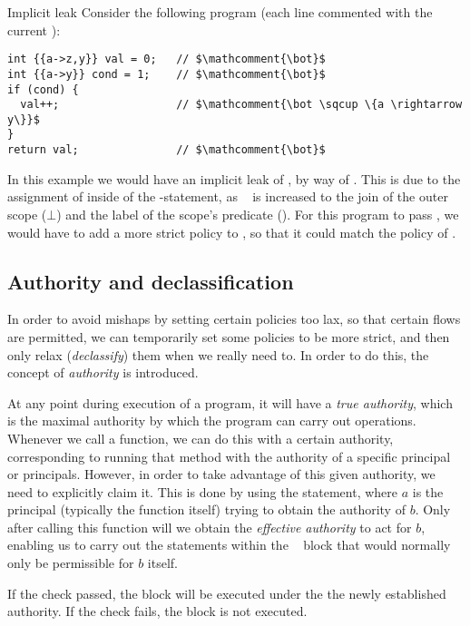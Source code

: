 \begin{example}{Implicit leak}\label{dlm:ex:implicit_leak}
  Consider the following program (each line commented with the current \dlmpc):
  \begin{lstlisting}[style=dlmc]
int {{a->z,y}} val = 0;   // $\mathcomment{\bot}$
int {{a->y}} cond = 1;    // $\mathcomment{\bot}$
if (cond) {
  val++;                  // $\mathcomment{\bot \sqcup \{a \rightarrow y\}}$
}
return val;               // $\mathcomment{\bot}$
  \end{lstlisting}
  In this example we would have an implicit leak of , by way of .
  This is due to the assignment of  inside of the -statement, as \dlmpc~ is increased to the join of the outer scope ($\bot$) and the label of the scope's predicate ().
  For this program to pass \thetool, we would have to add a more strict policy to , so that it could match the policy of .
\end{example}

\subsection{Authority and declassification}\label{dlm:auth_and_declass}
In order to avoid mishaps by setting certain policies too lax, so that certain flows are permitted, we can temporarily set some policies to be more strict, and then only relax (\emph{declassify}) them when we really need to.
In order to do this, the concept of \emph{authority} is introduced.

At any point during execution of a program, it will have a \emph{true authority}, which is the maximal authority by which the program can carry out operations.
Whenever we call a function, we can do this with a certain authority, corresponding to running that method with the authority of a specific principal or principals.
However, in order to take advantage of this given authority, we need to explicitly claim it.
This is done by using the \dlmactsfor{} statement, where $a$ is the principal (typically the function itself) trying to obtain the authority of $b$.
Only after calling this function will we obtain the \emph{effective authority} to act for $b$, enabling us to carry out the statements within the \dlmactsfor~ block that would normally only be permissible for $b$ itself.

If the check passed, the  block will be executed under the the newly established authority.
If the check fails, the block is not executed.

